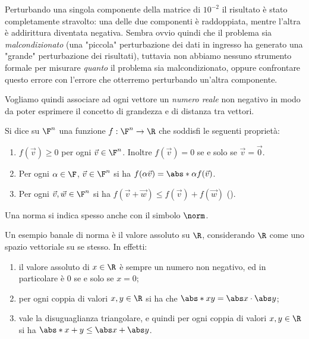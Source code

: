 Perturbando una singola componente della matrice di $10^{-2}$ il risultato è stato completamente stravolto: una delle due componenti è raddoppiata, mentre l'altra è addirittura diventata negativa. 
    Sembra ovvio quindi che il problema sia \emph{malcondizionato} (una "piccola" perturbazione dei dati in ingresso ha generato una "grande" perturbazione dei risultati), tuttavia non abbiamo nessuno strumento formale per misurare \emph{quanto} il problema sia malcondizionato, oppure confrontare questo errore con l'errore che otterremo perturbando un'altra componente.

Vogliamo quindi associare ad ogni vettore un \emph{numero reale} non negativo in modo da poter esprimere il concetto di grandezza e di distanza tra vettori.

\begin{definition}
    Si dice  su $\F^n$ una funzione $f : \F^n \to \R$ che soddisfi le seguenti proprietà:
    \begin{enumerate}[(1)]
        \item $f(\vec v) \geq 0$ per ogni $\vec v \in \F^n$. Inoltre $f(\vec v) = 0$ se e solo se $\vec v = \vec 0$.
        \item Per ogni $\alpha \in \F$, $\vec v \in \F^n$ si ha $f(\alpha\vec v) = \abs*{\alpha}f(\vec v)$.
        \item Per ogni $\vec v, \vec w \in \F^n$ si ha $f(\vec v + \vec w) \leq f(\vec v) + f(\vec w)$ ().  
    \end{enumerate} 
    Una norma si indica spesso anche con il simbolo $\norm$. 
\end{definition}

Un esempio banale di norma è il valore assoluto su $\R$, considerando $\R$ come uno spazio vettoriale su se stesso. In effetti:
\begin{enumerate}[(1)]
    \item il valore assoluto di $x \in \R$ è sempre un numero non negativo, ed in particolare è $0$ se e solo se $x = 0$;
    \item per ogni coppia di valori $x, y \in \R$ si ha che $\abs*{xy} = \abs x\cdot\abs y$;
    \item vale la disuguaglianza triangolare, e quindi per ogni coppia di valori $x, y \in \R$ si ha $\abs*{x + y} \leq \abs x + \abs y$. 
\end{enumerate}

